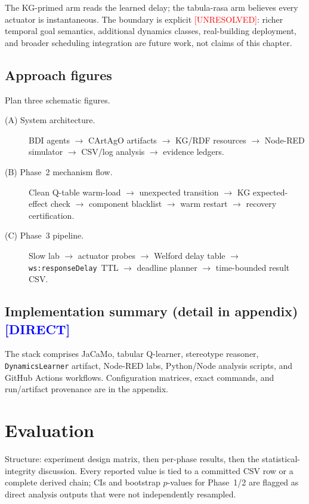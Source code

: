 \documentclass[12pt, a4paper, oneside]{memoir}
\newcommand{\evDirect}{\textcolor{blue}{[DIRECT]}}
\newcommand{\evUnresolved}{\textcolor{red}{[UNRESOLVED]}}
\newcommand{\wsRD}{\texttt{ws:responseDelay}}
\begin{document}
The KG-primed arm reads the learned delay; the tabula-rasa arm believes
every actuator is instantaneous.  The boundary is explicit \evUnresolved:
richer temporal goal semantics, additional dynamics classes, real-building
deployment, and broader scheduling integration are future work, not claims of
this chapter.

\section{Approach figures}
\label{sec:approach-figures}

Plan three schematic figures.
\begin{description}
  \item[(A) System architecture.]
    BDI agents $\to$ CArtAgO artifacts $\to$ KG/RDF resources $\to$ Node-RED
    simulator $\to$ CSV/log analysis $\to$ evidence ledgers.

  \item[(B) Phase~2 mechanism flow.]
    Clean Q-table warm-load $\to$ unexpected transition $\to$ KG
    expected-effect check $\to$ component blacklist $\to$ warm restart $\to$
    recovery certification.

  \item[(C) Phase~3 pipeline.]
    Slow lab $\to$ actuator probes $\to$ Welford delay table $\to$ \wsRD\
    TTL $\to$ deadline planner $\to$ time-bounded result CSV\@.
\end{description}

\section{Implementation summary (detail in appendix) \evDirect}
\label{sec:approach-impl}

The stack comprises JaCaMo, tabular Q-learner, stereotype reasoner,
\texttt{DynamicsLearner} artifact, Node-RED labs, Python/Node analysis
scripts, and GitHub Actions workflows.  Configuration matrices, exact
commands, and run/artifact provenance are in the appendix.

\chapter{Evaluation}
\label{ch:evaluation}

Structure: experiment design matrix, then per-phase results, then the
statistical-integrity discussion.  Every reported value is tied to a
committed CSV row or a complete derived chain; CIs and bootstrap $p$-values
for Phase~1/2 are flagged as direct analysis outputs that were not
independently resampled.
\end{document}
